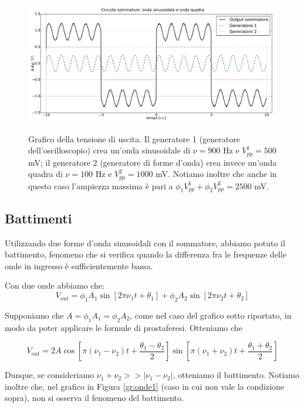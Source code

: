 $$$$

\begin{figure}[ht]
 \centering
   {\includegraphics[width=16.5cm]{../E01/latex/sinquad.pdf}}
 \caption{Grafico della tensione di uscita. Il generatore 1 (generatore dell'oscilloscopio) crea un'onda sinusoidale di $\nu=900$ \si{\hertz} e $V^1_{pp}=500$ \si{\milli\volt}; il generatore 2 (generatore di forme d'onda) crea invece un'onda quadra di $\nu=100$ \si{\hertz} e $V^2_{pp}=1000$ \si{\milli\volt}. Notiamo inoltre che anche in questo caso l'ampiezza massima è pari a $\phi_1 V^1_{pp}+\phi_2 V^2_{pp}=2500$ \si{\milli\volt}.}
 \label{gr:onde2}
\end{figure}

\subsection{Battimenti}

Utilizzando due forme d'onda sinusoidali con il sommatore, abbiamo potuto il battimento, fenomeno che si verifica quando la differenza fra le frequenze delle onde in ingresso è sufficientemente bassa.

Con due onde abbiamo che:
\begin{equation}
V_{out}=\phi_1 A_1 \sin [2 \pi \nu_1 t + \theta_1] + \phi_2 A_2 \sin [2 \pi \nu_2 t + \theta_2]
\label{eq: battimenti1}
\end{equation}

Supponiamo che $A=\phi_1 A_1=\phi_2 A_2$, come nel caso del grafico sotto riportato, in modo da poter applicare le formule di prostaferesi. Otteniamo che

$$V_{out}=2A \cos \left[\pi (\nu_1 - \nu_2)t + \frac{\theta_1-\theta_2}{2}\right] \sin \left[\pi (\nu_1 + \nu_2) t + \frac{\theta_1+\theta_2}{2}\right]$$

Dunque, se consideriamo $\nu_1 + \nu_2 >> |\nu_1 - \nu_2|$, otteniamo il battimento. Notiamo inoltre che, nel grafico in Figura \ref{gr:onde1} (caso in cui non vale la condizione sopra), non si osserva il fenomeno del battimento.

